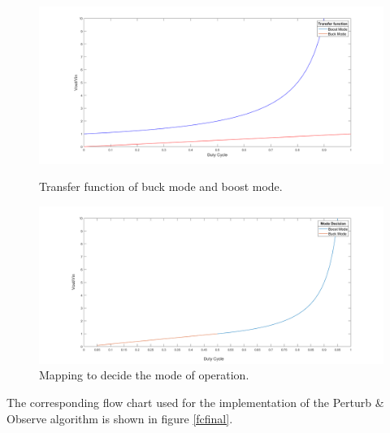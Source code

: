 \begin{figure}[H]
	\begin{minipage}[b]{0.9\linewidth}
		\centering
		\includegraphics[width=\textwidth]{../Pictures/transfer_function_buck_boost_mode}
		\caption{Transfer function of buck mode and boost mode.}
		\label{fig:tfmodes}
	\end{minipage}
	\hspace{0.5cm}
	\begin{minipage}[b]{0.9\linewidth}
		\centering
		\includegraphics[width=\textwidth]{../Pictures/Mode_decision_duty_vs_gain}
		\caption{Mapping to decide the mode of operation.}
		\label{fig:modedecisionmapping}
	\end{minipage}
\end{figure}


The corresponding flow chart used for the implementation of the Perturb \& Observe algorithm is shown in figure \ref{fcfinal}.


